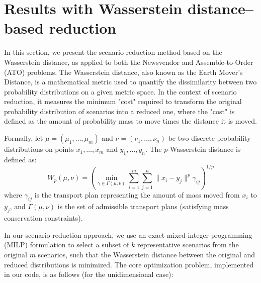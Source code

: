 \documentclass[a4paper,12pt]{article}
\begin{document}
	
	\section{Results with Wasserstein distance--based reduction}
	
	In this section, we present the scenario reduction method based on the Wasserstein distance, as applied to both the Newsvendor and Assemble-to-Order (ATO) problems. The Wasserstein distance, also known as the Earth Mover's Distance, is a mathematical metric used to quantify the dissimilarity between two probability distributions on a given metric space. In the context of scenario reduction, it measures the minimum "cost" required to transform the original probability distribution of scenarios into a reduced one, where the "cost" is defined as the amount of probability mass to move times the distance it is moved.
	
	Formally, let $\mu = (\mu_1, \ldots, \mu_m)$ and $\nu = (\nu_1, \ldots, \nu_n)$ be two discrete probability distributions on points $x_1, \ldots, x_m$ and $y_1, \ldots, y_n$. The $p$-Wasserstein distance is defined as:
	\[
	W_p(\mu, \nu) = \left( \min_{\gamma \in \Gamma(\mu, \nu)} \sum_{i=1}^m \sum_{j=1}^n \|x_i - y_j\|^p \gamma_{ij} \right)^{1/p}
	\]
	where $\gamma_{ij}$ is the transport plan representing the amount of mass moved from $x_i$ to $y_j$, and $\Gamma(\mu, \nu)$ is the set of admissible transport plans (satisfying mass conservation constraints).
	
	In our scenario reduction approach, we use an exact mixed-integer programming (MILP) formulation to select a subset of $k$ representative scenarios from the original $m$ scenarios, such that the Wasserstein distance between the original and reduced distributions is minimized. The core optimization problem, implemented in our code, is as follows (for the unidimensional case):
	
\end{document}
